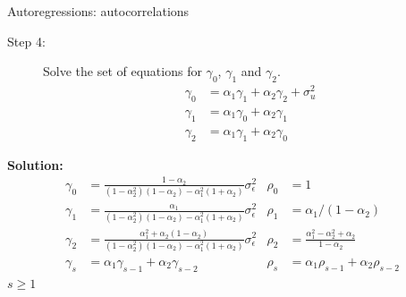 \documentclass[notes,blackandwhite,mathsans]{beamer}
\begin{document}
\begin{frame}{Autoregressions: autocorrelations}
\small

\begin{description}
\item[Step 4:]{\color{mcxs2}Solve} {\color{mcxs2}the set of equations for} $\gamma_0$, $\gamma_1$ {\color{mcxs2}and} $\gamma_2$.
\begin{align*} 
\gamma_0 &= \alpha_1\gamma_{1} + \alpha_2\gamma_{2} + \sigma_u^2 \\
\gamma_1 &= \alpha_1\gamma_{0} + \alpha_2\gamma_{1} \\
\gamma_2 &= \alpha_1\gamma_{1} + \alpha_2\gamma_{0}
\end{align*}
\end{description}

\textbf{Solution:}
\begin{align*}
\gamma_0 &= \frac{1-\alpha_2}{(1-\alpha_2^2)(1-\alpha_2) - \alpha_1^2(1+\alpha_2)} \sigma_\epsilon^2 & \rho_0 &= 1 \\
\gamma_1 &= \frac{\alpha_1}{(1-\alpha_2^2)(1-\alpha_2) - \alpha_1^2(1+\alpha_2)} \sigma_\epsilon^2 & \rho_1 &= \alpha_1/(1-\alpha_2)\\
\gamma_2 &= \frac{\alpha_1^2 + \alpha_2(1-\alpha_2)}{(1-\alpha_2^2)(1-\alpha_2) - \alpha_1^2(1+\alpha_2)} \sigma_\epsilon^2 & \rho_2 &= \frac{\alpha_1^2 - \alpha_2^2 + \alpha_2}{1-\alpha_2}\\
\gamma_s &= \alpha_1\gamma_{s-1} + \alpha_2\gamma_{s-2} & \rho_s &= \alpha_1 \rho_{s-1} + \alpha_2\rho_{s-2}
\end{align*}
 $s\geq1$
\end{frame}
\end{document}
